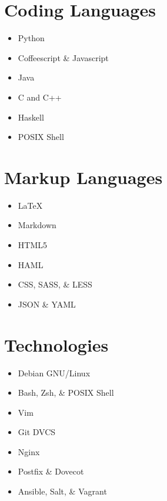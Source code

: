 \documentclass[11pt, letterpaper]{article}
\begin{document}
\setlength{\columnsep}{13pt}
\begin{multicols}{3}
\raggedcolumns

\newenvironment{technologylist}[1]{%
    \section{#1}
    \begin{minipage}{\columnwidth}
        \begin{small}
            \begin{itemize}%
}{%
            \end{itemize}
        \end{small}
    \end{minipage}
    \columnbreak%
}

\begin{technologylist}{Coding Languages}
    \item Python
    \item Coffeescript \& Javascript
    \item Java
    \item C and C++
    \item Haskell
    \item POSIX Shell
\end{technologylist}
\begin{technologylist}{Markup Languages}
    \item \LaTeX
    \item Markdown
    \item HTML5
    \item HAML
    \item CSS, SASS, \& LESS
    \item JSON \& YAML
\end{technologylist}
\begin{technologylist}{Technologies}
\item Debian GNU/Linux
\item Bash, Zsh, \& POSIX Shell
\item Vim
\item Git DVCS
\item Nginx
\item Postfix \& Dovecot
\item Ansible, Salt, \& Vagrant
\end{technologylist}

\end{multicols}


\end{document}
